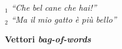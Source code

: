 \begin{frame}[t,fragile]
{{\begin{minipage}[t]{.9\textwidth}
{\begin{table}
\begin{tabular}{cc|c|c|c|c|c|c|c|c|c|c}
						\end{tabular}
					\end{table}
				}
				\renewcommand{\epigraphsize}{\scriptsize}
				\setlength{\afterepigraphskip}{0pt}
				\setlength{\beforeepigraphskip}{0pt}
				\setlength{\epigraphwidth}{0.9\textwidth}
				\epigraph{\textit{\alert{\faFile$_1$} ``Che\,\Vtextvisiblespace[1em]\,bel\,\Vtextvisiblespace\,cane\,\Vtextvisiblespace[1cm]\,che\,\Vtextvisiblespace[.5em]\,hai!''\\
				\alert{\faFile$_2$} ``Ma\,\Vtextvisiblespace[.3cm]\,il\,\Vtextvisiblespace[1cm]\,mio\,\Vtextvisiblespace[.1cm]\,gatto\,\Vtextvisiblespace[1em]\,è\,\Vtextvisiblespace[.5em]\,più\,\Vtextvisiblespace[1cm]\,bello''
				}}{\textbf{Vettori \textit{bag-of-words}}}
		\end{minipage}
		}	
	}
\end{frame}
%
